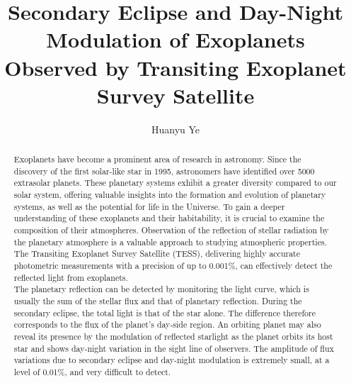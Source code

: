 \documentclass{article}
\title{Secondary Eclipse and Day-Night Modulation of Exoplanets Observed by Transiting Exoplanet Survey Satellite}
\author{Huanyu Ye}
\date{}
\begin{document}
\maketitle


\begin{abstract}
\noindent Exoplanets have become a prominent area of research in astronomy. Since the discovery of the first solar-like star in 1995, astronomers have identified over 5000 extrasolar planets. These planetary systems exhibit a greater diversity compared to our solar system, offering valuable insights into the formation and evolution of planetary systems, as well as the potential for life in the Universe. To gain a deeper understanding of these exoplanets and their habitability, it is crucial to examine the composition of their atmospheres. Observation of the reflection of stellar radiation by the planetary atmosphere is a valuable approach to studying atmospheric properties. The Transiting Exoplanet Survey Satellite (TESS), delivering highly accurate photometric measurements with a precision of up to 0.001\%, can effectively detect the reflected light from exoplanets.\\

\noindent The planetary reflection can be detected by monitoring the light curve, which is usually the sum of the stellar flux and that of planetary reflection. During the secondary eclipse, the total light is that of the star alone. The difference therefore corresponds to the flux of the planet’s day-side region. An orbiting planet may also reveal its presence by the modulation of reflected starlight as the planet orbits its host star and shows day-night variation in the sight line of observers. The amplitude of flux variations due to secondary eclipse and day-night modulation is extremely small, at a level of 0.01\%, and very difficult to detect.\\
    

\end{abstract}
\end{document}
